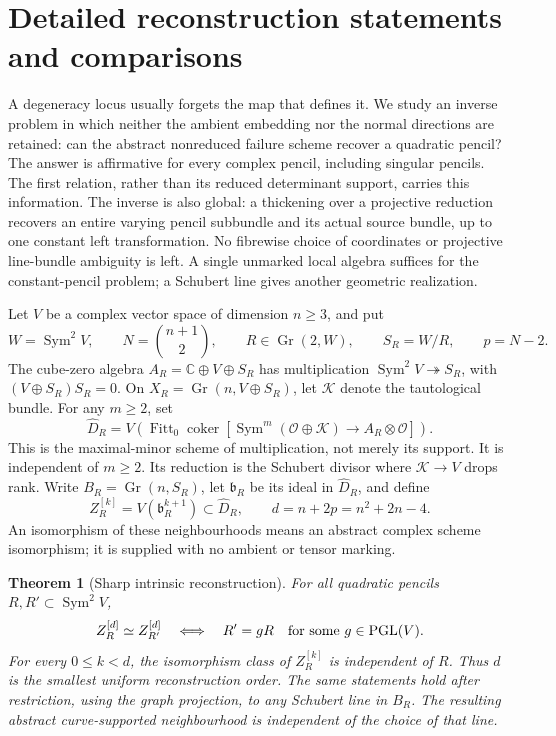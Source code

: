 \documentclass[11pt,reqno]{amsart}
\numberwithin{equation}{section}
\newtheorem{theorem}{Theorem}[section]
\theoremstyle{definition}\newtheorem{definition}[theorem]{Definition}
\theoremstyle{remark}\newtheorem{remark}[theorem]{Remark}
\newcommand{\C}{\mathbb C}\newcommand{\Q}{\mathbb Q}
\newcommand{\OO}{\mathcal O}\newcommand{\II}{\mathcal I}
\DeclareMathOperator{\Sym}{Sym}\DeclareMathOperator{\Gr}{Gr}
\DeclareMathOperator{\Fitt}{Fitt}\DeclareMathOperator{\Ann}{Ann}
\DeclareMathOperator{\coker}{coker}\DeclareMathOperator{\codim}{codim}
\begin{document}
\appendix

\section{Detailed reconstruction statements and comparisons}
\label{sec:introduction-v132}

A degeneracy locus usually forgets the map that defines it.  We study
an inverse problem in which neither the ambient embedding nor the
normal directions are retained: can the abstract nonreduced failure
scheme recover a quadratic pencil?  The answer is affirmative for
every complex pencil, including singular pencils.  The first relation, rather than its reduced determinant support,
carries this information.  The inverse is also global: a thickening over a projective reduction
recovers an entire varying pencil subbundle and its actual source
bundle, up to one constant left transformation.  No fibrewise choice
of coordinates or projective line-bundle ambiguity is left.  A
single unmarked local algebra suffices for the constant-pencil
problem; a Schubert line gives another geometric realization.

Let \(V\) be a complex vector space of dimension \(n\ge3\), and put
\[
 W=\Sym^2V,\qquad N=\binom{n+1}{2},\qquad
 R\in\Gr(2,W),\qquad S_R=W/R,\qquad p=N-2.
\]
The cube-zero algebra \(A_R=\C\oplus V\oplus S_R\) has multiplication
\(\Sym^2V\twoheadrightarrow S_R\), with
\((V\oplus S_R)S_R=0\).  On \(X_R=\Gr(n,V\oplus S_R)\), let
\(\mathcal K\) denote the tautological bundle.  For any \(m\ge2\), set
\begin{equation}\label{eq:failure-intro}
 \widehat D_R=V\!\left(\Fitt_0\coker[
 \Sym^m(\OO\oplus\mathcal K)\longrightarrow A_R\otimes\OO]\right).
\end{equation}
This is the maximal-minor scheme of multiplication, not merely its
support.  It is independent of \(m\ge2\).  Its reduction is the
Schubert divisor where \(\mathcal K\to V\) drops rank.  Write
\(B_R=\Gr(n,S_R)\), let \(\mathfrak b_R\) be its ideal in
\(\widehat D_R\), and define
\[
 Z_R^{[k]}=V(\mathfrak b_R^{k+1})\subset\widehat D_R,
       \qquad d=n+2p=n^2+2n-4.
\]
An isomorphism of these neighbourhoods means an abstract complex
scheme isomorphism; it is supplied with no ambient or tensor marking.

\begin{theorem}[Sharp intrinsic reconstruction]
\label{thm:principal-finite-v143}
For all quadratic pencils \(R,R'\subset\Sym^2V\),
\[
 Z_R^{[d]}\simeq Z_{R'}^{[d]}
       \quad\Longleftrightarrow\quad
 R'=gR\quad\text{for some }g\in\operatorname{PGL}(V).
\]
For every \(0\le k<d\), the isomorphism class of \(Z_R^{[k]}\)
is independent of \(R\).  Thus \(d\) is the smallest uniform
reconstruction order.  The same statements hold after restriction,
using the graph projection, to any Schubert line in \(B_R\).
The resulting abstract curve-supported neighbourhood is independent
of the choice of that line.
\end{theorem}
\end{document}
